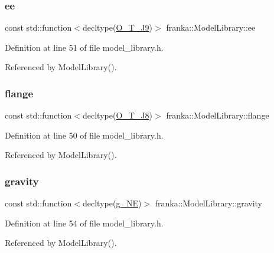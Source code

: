 \subsubsection{\texorpdfstring{ee}{ee}}
{\footnotesize\ttfamily const std\+::function$<$decltype(\hyperlink{libfcimodels_8h_a472426c06cf7bb8b89546d39e00d1bbd}{O\+\_\+\+T\+\_\+\+J9})$>$ franka\+::\+Model\+Library\+::ee}



Definition at line 51 of file model\+\_\+library.\+h.



Referenced by Model\+Library().

\mbox{\label{classfranka_1_1ModelLibrary_a538628841d211a1db3e491ffe19e6fa1}} 
\subsubsection{\texorpdfstring{flange}{flange}}
{\footnotesize\ttfamily const std\+::function$<$decltype(\hyperlink{libfcimodels_8h_ada18495666330695c6605732368d3d6e}{O\+\_\+\+T\+\_\+\+J8})$>$ franka\+::\+Model\+Library\+::flange}



Definition at line 50 of file model\+\_\+library.\+h.



Referenced by Model\+Library().

\mbox{\label{classfranka_1_1ModelLibrary_a13d4490081efdb7bfd46f32a12a2b007}} 
\subsubsection{\texorpdfstring{gravity}{gravity}}
{\footnotesize\ttfamily const std\+::function$<$decltype(\hyperlink{libfcimodels_8h_a0aaaba780142c32b2311100b51bc9cc0}{g\+\_\+\+NE})$>$ franka\+::\+Model\+Library\+::gravity}



Definition at line 54 of file model\+\_\+library.\+h.



Referenced by Model\+Library().

